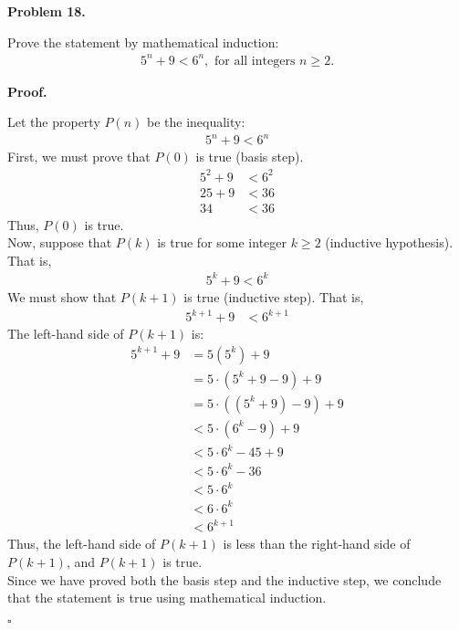 \documentclass{article}
\newenvironment{problem}[1]{
    \begin{mdframed}[backgroundcolor=gray!20, skipabove=\baselineskip, skipbelow=\baselineskip, nobreak=true, innerleftmargin=10pt, innerrightmargin=10pt, innertopmargin=10pt, innerbottommargin=10pt]
    \textbf{Problem #1.}
}{
    \end{mdframed}
}
\newenvironment{proof}{
    \begin{mdframed}[nobreak=false, innerleftmargin=10pt, innerrightmargin=10pt, innertopmargin=10pt, innerbottommargin=10pt]
    \textbf{Proof.}
}{
    \hfill $\square$
    \end{mdframed}
}
\begin{document}
    \begin{problem}{18}
        Prove the statement by mathematical induction:
        \begin{align*}
            5^n + 9 < 6^n, \text{ for all integers } n \geq 2.
        \end{align*}
    \end{problem}
    \begin{proof}
        Let the property $P(n)$ be the inequality:
        \begin{align*}
            5^n + 9 < 6^n
        \end{align*}
        First, we must prove that $P(0)$ is true (basis step).
        \begin{align*}
            5^2 + 9 &< 6^2 \\
            25 + 9 &< 36 \\
            34 &< 36
        \end{align*}
        Thus, $P(0)$ is true. \\
        Now, suppose that $P(k)$ is true for some integer $k \geq 2$ (inductive hypothesis). That is,
        \begin{align*}
            5^k + 9 < 6^k
        \end{align*}
        We must show that $P(k+1)$ is true (inductive step). That is,
        \begin{align*}
            5^{k+1} + 9 &< 6^{k+1}
        \end{align*}
        The left-hand side of $P(k+1)$ is:
        \begin{align*}
            5^{k+1} + 9 &= 5(5^k) + 9 \\
            &= 5 \cdot (5^k + 9 - 9) + 9 \\
            &= 5 \cdot ((5^k + 9) - 9) + 9 \\
            &< 5 \cdot (6^k-9) + 9 \\
            &< 5 \cdot 6^k - 45 + 9 \\
            &< 5 \cdot 6^k - 36 \\
            &< 5 \cdot 6^k \\
            &< 6 \cdot 6^k \\
            &< 6^{k+1}
        \end{align*}
        Thus, the left-hand side of $P(k+1)$ is less than the right-hand side of $P(k+1)$, and $P(k+1)$ is true. \\
        Since we have proved both the basis step and the inductive step, we conclude that the statement is true using mathematical induction.
    \end{proof}
\end{document}
